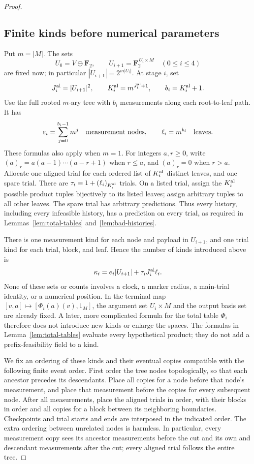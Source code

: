 \begin{proof}
\subsection*{Finite kinds before numerical parameters}
Put \(m=|M|\). The sets
\[
 U_0=V\oplus\mathbf F_2,
 \qquad U_{i+1}=\mathbf F_2^{\,U_i\times M}\quad(0\le i\le4)
\]
are fixed now; in particular
\( |U_{i+1}|=2^{m|U_i|}\).
At stage \(i\), set
\[
 J_i^{\rm al}=|U_{i+1}|^2,
 \qquad K_i^{\rm al}=m^{J_i^{\rm al}+1},
 \qquad b_i=K_i^{\rm al}+1.
\]
Use the full rooted \(m\)-ary tree with \(b_i\) measurements along each
root-to-leaf path. It has
\[
 e_i=\sum_{j=0}^{b_i-1}m^j
 \quad\hbox{measurement nodes},\qquad
 \ell_i=m^{b_i}\quad\hbox{leaves}.
\]
These formulas also apply when \(m=1\). For integers \(a,r\ge0\),
write \((a)_r=a(a-1)\cdots(a-r+1)\) when \(r\le a\), and
\((a)_r=0\) when \(r>a\). Allocate one aligned trial for each ordered
list of \(K_i^{\rm al}\) distinct leaves, and one spare trial. There
are \(\tau_i=1+(\ell_i)_{K_i^{\rm al}}\) trials.
On a listed trial, assign the \(K_i^{\rm al}\) possible product tuples
bijectively to its listed leaves; assign arbitrary tuples to all
other leaves. The spare trial has arbitrary predictions. Thus every
history, including every infeasible history, has a prediction on every
trial, as required in Lemmas~\ref{lem:total-tables}
and~\ref{lem:bad-histories}.

There is one measurement kind for each node and payload in
\(U_{i+1}\), and one trial kind for each trial, block, and leaf. Hence
the number of kinds introduced above is
\begin{equation}\label{eq:parameter-kinds}
 \kappa_i=e_i|U_{i+1}|+
              \tau_iJ_i^{\rm al}\ell_i.
\end{equation}
None of these sets or counts involves a clock, a marker radius, a
main-trial identity, or a numerical position. In the terminal map
\([v,a]\mapsto[\Phi_i(a)(v),1_M]\), the argument set \(U_i\times M\)
and the output basis set are already fixed. A later, more complicated
formula for the total table \(\Phi_i\) therefore does not introduce
new kinds or enlarge the spaces. The formulas in
Lemma~\ref{lem:total-tables} evaluate every hypothetical product; they
do not add a prefix-feasibility field to a kind.

We fix an ordering of these kinds and their eventual copies compatible
with the following finite event order. First order the tree nodes
topologically, so that each ancestor precedes its descendants.
Place all copies for a node before that node's measurement, and place
that measurement before the copies for every subsequent node.
After all measurements, place the aligned trials in order, with their
blocks in order and all copies for a block between its neighboring
boundaries. Checkpoints and trial starts and ends are interposed in
the indicated order. The extra ordering between unrelated nodes is
harmless. In particular, every measurement copy sees its ancestor
measurements before the cut and its own and descendant measurements
after the cut; every aligned trial follows the entire tree.


\end{proof}
